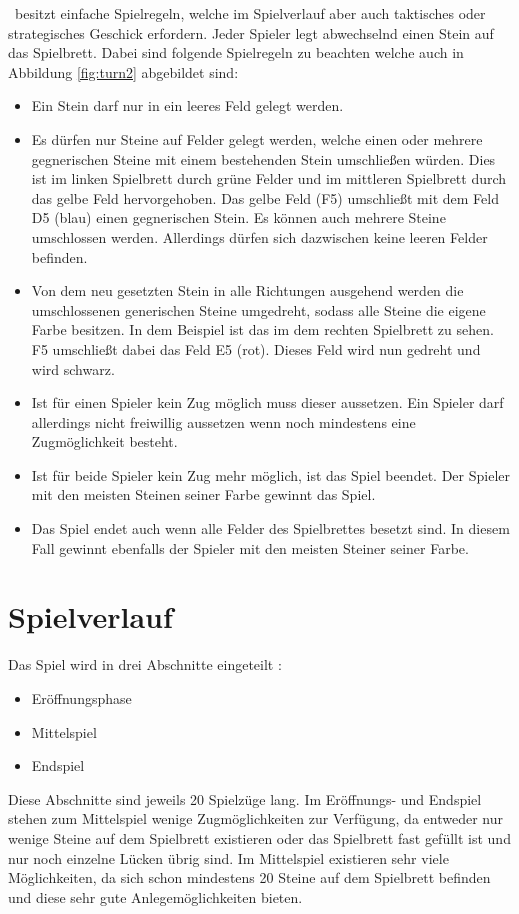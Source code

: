 \ot\ besitzt einfache Spielregeln, welche im Spielverlauf aber auch taktisches oder strategisches Geschick erfordern. Jeder Spieler legt abwechselnd einen Stein auf das Spielbrett. Dabei sind folgende Spielregeln zu beachten welche auch in Abbildung \ref{fig:turn2} abgebildet sind:
\begin{itemize}
\item Ein Stein darf nur in ein leeres Feld gelegt werden.
\item Es dürfen nur Steine auf Felder gelegt werden, welche einen oder mehrere gegnerischen Steine mit einem bestehenden Stein umschließen würden. Dies ist im linken Spielbrett durch grüne Felder und im mittleren Spielbrett durch das gelbe Feld hervorgehoben. Das gelbe Feld (F5) umschließt mit dem Feld D5 (blau) einen gegnerischen Stein. Es können auch mehrere Steine umschlossen werden. Allerdings dürfen sich dazwischen keine leeren Felder befinden.
\item Von dem neu gesetzten Stein in alle Richtungen ausgehend werden die umschlossenen generischen Steine umgedreht, sodass alle Steine die eigene Farbe besitzen. In dem Beispiel ist das im dem rechten Spielbrett zu sehen. F5 umschließt dabei das Feld E5 (rot). Dieses Feld wird nun gedreht und wird schwarz.
\item Ist für einen Spieler kein Zug möglich muss dieser aussetzen. Ein Spieler darf allerdings nicht freiwillig aussetzen wenn noch mindestens eine Zugmöglichkeit besteht.
\item Ist für beide Spieler kein Zug mehr möglich, ist das Spiel beendet. Der Spieler mit den meisten Steinen seiner Farbe gewinnt das Spiel.
\item Das Spiel endet auch wenn alle Felder des Spielbrettes besetzt sind. In diesem Fall gewinnt ebenfalls der Spieler mit den meisten Steiner seiner Farbe.
\end{itemize}
\section{Spielverlauf}
Das Spiel wird in drei Abschnitte eingeteilt \cite{Ortiz.}:
\begin{itemize}
\item Eröffnungsphase
\item Mittelspiel
\item Endspiel
\end{itemize}
Diese Abschnitte sind jeweils 20 Spielzüge lang.
Im Eröffnungs- und Endspiel stehen zum Mittelspiel wenige Zugmöglichkeiten zur Verfügung, da entweder nur wenige Steine auf dem Spielbrett existieren oder das Spielbrett fast gefüllt ist und nur noch einzelne Lücken übrig sind. Im Mittelspiel existieren sehr viele Möglichkeiten, da sich schon mindestens 20 Steine auf dem Spielbrett befinden und diese sehr gute Anlegemöglichkeiten bieten. 
